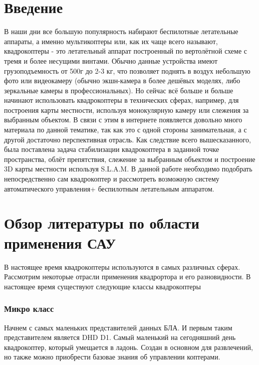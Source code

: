 






\section*{Введение}

В наши дни все большую популярность набирают беспилотные летательные аппараты, а именно мультикоптеры или, как их чаще всего называют, квадрокоптеры - это летательный аппарат построенный по вертолётной схеме с тремя и более несущими винтами. Обычно данные устройства имеют грузоподъемность от 500г до 2-3 кг, что позволяет поднять в воздух небольшую фото или видеокамеру (обычно экшн-камера в более дешёвых моделях, либо зеркальные камеры в профессиональных). Но сейчас всё больше и больше начинают использовать квадрокоптеры в технических сферах, например, для построения карты местности, используя монокулярную камеру или слежения за выбранным объектом. В связи с этим в интернете появляется довольно много материала по данной тематике, так как это с одной стороны занимательная, а с другой достаточно перспективная отрасль. Как следствие всего вышесказанного, была поставлена задача стабилизации квадрокоптера в заданной точке пространства, облёт препятствия, слежение за выбранным объектом и построение 3D карты местности используя S.L.A.M. В данной работе необходимо подобрать непосредственно сам квадрокоптер и рассмотреть возможную систему автоматического управления+ беспилотным летательным аппаратом.

\newpage

\section{Обзор литературы по области применения САУ}

В настоящее время квадрокоптеры используются в самых различных сферах. Рассмотрим некоторые отрасли применения квадрортора и его разновидности.
В настоящее время существуют следующие классы квадрокоптеры
\subsubsection{Микро класс}
Начнем с самых маленьких представителей данных БЛА. И первым таким представителем является DHD D1. Самый маленький на сегодняшний день квадрокоптер, который умещается в ладонь.  Создан в основном для развлечений, но также можно приобрести базовае знания об управлении коптерами.\cite{geek}
